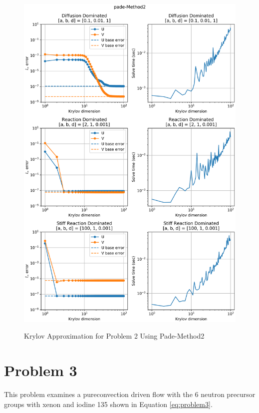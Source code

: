 \begin{figure}[t]
  \centering
  \includegraphics[width=5.75in]{images/pade-Method2KrylovProblem2.png}\\
  \caption{Krylov Approximation for Problem 2 Using Pade-Method2}
  \label{fig:errorProblem2padeM2Krylov}
\end{figure} 

\FloatBarrier


\section{Problem 3}
This problem examines a pureconvection driven flow with the 6 neutron precursor groups with xenon and iodine 135 shown in Equation \ref{eq:problem3}. 

